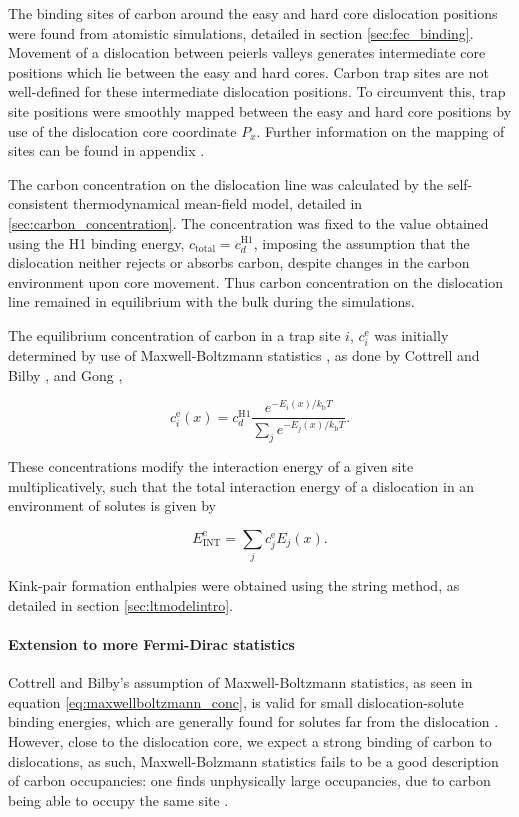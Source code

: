 \documentclass[a4paper,11pt]{article}
\numberwithin{equation}{chapter}
\numberwithin{listing}{chapter}
\begin{document}
The binding sites of carbon around the easy and hard core dislocation
positions were found from atomistic simulations, detailed in section
\ref{sec:fec_binding}. Movement of a dislocation between peierls valleys
generates intermediate core positions which lie between the easy and hard
cores. Carbon trap sites are not well-defined for these intermediate
dislocation positions. To circumvent this, trap site positions were smoothly mapped between
the easy and hard core positions by use of the dislocation core coordinate
\(P_x\). Further information on the mapping of sites can be found in appendix
\label{sec:smoothsitemapping}.


The carbon concentration on the dislocation line was calculated by the
self-consistent thermodynamical mean-field model, detailed in
\ref{sec:carbon_concentration}. The concentration was fixed to the value
obtained using the H1 binding energy, \(c_{\text{total}} = c_d^{\text{H}1}\),
imposing the assumption that the dislocation neither rejects or absorbs
carbon, despite changes in the carbon environment upon core
movement. Thus carbon concentration on the dislocation line remained in
equilibrium with the bulk during the simulations.

The equilibrium concentration of carbon in a trap site \(i\),
\(c_{i}^{\text{e}}\) was initially determined by use of
Maxwell-Boltzmann statistics \cite{Anderson2017}, as done by Cottrell and
Bilby \cite{Cottrell1949}, and Gong \cite{Gong2020},

\[  c_{i}^{\text{e}}(x) = c_d^{\text{H}1} \frac{ e^{-E_i(x) /
    k_{\text{b}} T } }{\sum_j e^{-E_j(x) / k_{\text{b}}T} }.  \label{eq:maxwellboltzmann_conc}\]

These concentrations modify the interaction energy of a given site
multiplicatively, such that the total interaction energy of a dislocation in
an environment of solutes is given by

\[ E_{\text{INT}}^{\text{e}} = \sum_j c_j^{\text{e}} E_j(x).\]


Kink-pair formation enthalpies were obtained using the string method, as
detailed in section \ref{sec:ltmodelintro}.


\paragraph{Extension to more Fermi-Dirac statistics}
\label{sec:org49a2734}
\label{sec:concentration_statistics_discussion}

Cottrell and Bilby's assumption of Maxwell-Boltzmann statistics, as seen in
equation \eqref{eq:maxwellboltzmann_conc}, is valid for small
dislocation-solute binding energies, which are generally found for solutes far from the
dislocation \cite{Veiga2013}. However, close to the dislocation core, we
expect a strong binding of carbon to dislocations, as such, Maxwell-Bolzmann
statistics fails to be a good description of carbon occupancies: one finds
unphysically large occupancies, due to carbon being able to occupy the same
site \cite{Nematollahi2016}.
\end{document}
